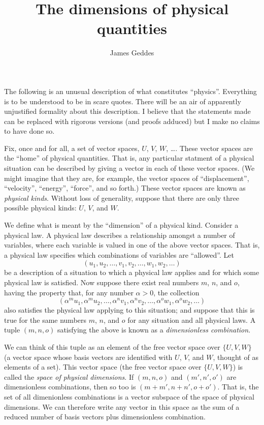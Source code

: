 \documentclass[a4paper, twocolumn, 10pt]{article}
\title{The dimensions of physical quantities}
\author{James Geddes}
\begin{document}
\maketitle

The following is an unusual description of what constitutes
``physics''. Everything is to be understood to be in scare quotes. There will be an
air of apparently unjustified formality about this description. I believe that
the statements made can be replaced with rigorous versions (and proofs adduced)
but I make no claims to have done so.

Fix, once and for all, a set of vector spaces, $U$, $V$, $W$, \ldots. These
vector spaces are the ``home'' of physical quantities. That is, any particular
statment of a physical situation can be described by giving a vector in each of
these vector spaces. (We might imagine that they are, for example, the vector
spaces of ``displacement'', ``velocity'', ``energy'', ``force'', and so forth.)
These vector spaces are known as \emph{physical kinds}. Without loss of
generality, suppose that there are only three possible physical kinds: $U$, $V$,
and $W$. 

We define what is meant by the ``dimension'' of a physical kind. Consider a
physical law. A physical law describes a relationship amongst a number of
variables, where each variable is valued in one of the above vector spaces. That
is, a physical law specifies which combinations of variables are
``allowed''. Let
\[
(u_1, u_2, \dotsc, v_1, v_2, \dotsc, w_1, w_2, \dotsc )
\]
be a description of a situation to which a physical law applies and for which
some physical law is satisfied. Now suppose there exist real numbers $m$, $n$,
and $o$, having the property that, for any number $\alpha>0$, the collection
\[
(\alpha^m u_1,
\alpha^m u_2, \dotsc, \alpha^n v_1, \alpha^n v_2, \dotsc, \alpha^o w_1, \alpha^o
w_2, \dotsc )
\]
also satisfies the physical law applying to this situation; and suppose that
this is true for the same numbers $m$, $n$, and $o$ for any situation and all
physical laws. A tuple $(m, n, o)$ satisfying the above is known as a
\emph{dimensionless combination}. 

We can think of this tuple as an element of the free vector space over $\{U, V,
W\}$ (a vector space whose basis vectors are identified with $U$, $V$, and $W$,
thought of as elements of a set). This vector space (the free vector space over
$\{U, V, W\}$) is called the \emph{space of physical dimensions}. If $(m, n, o)$
and $(m', n', o')$ are dimensionless combinations, then so too is $(m+m', n+n',
o+o')$. That is, the set of all dimenionless combinations is a vector subspace
of the space of physical dimensions. We can therefore write any vector in this
space as the sum of a reduced number of basis vectors plus dimensionless
combination.
\end{document}
